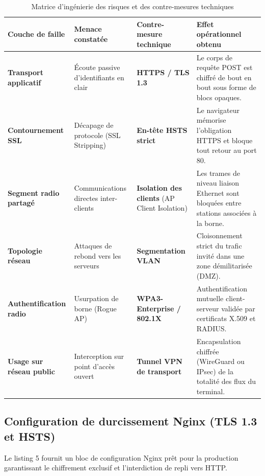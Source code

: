 \documentclass[a4paper,11pt]{article}
\begin{document}
\begin{table}[htbp]
\centering
\small
\caption{Matrice d'ingénierie des risques et des contre-mesures techniques}
\begin{tabularx}{\textwidth}{l p{3.2cm} p{3.6cm} X}
\toprule
\textbf{Couche de faille} & \textbf{Menace constatée} & \textbf{Contre-mesure technique} & \textbf{Effet opérationnel obtenu} \\
\midrule
\textbf{Transport applicatif} & Écoute passive d'identifiants en clair & \textbf{HTTPS / TLS 1.3} & Le corps de requête POST est chiffré de bout en bout sous forme de blocs opaques. \\
\textbf{Contournement SSL} & Décapage de protocole (SSL Stripping) & \textbf{En-tête HSTS strict} & Le navigateur mémorise l'obligation HTTPS et bloque tout retour au port 80. \\
\textbf{Segment radio partagé} & Communications directes inter-clients & \textbf{Isolation des clients} (AP Client Isolation) & Les trames de niveau liaison Ethernet sont bloquées entre stations associées à la borne. \\
\textbf{Topologie réseau} & Attaques de rebond vers les serveurs & \textbf{Segmentation VLAN} & Cloisonnement strict du trafic invité dans une zone démilitarisée (DMZ). \\
\textbf{Authentification radio} & Usurpation de borne (Rogue AP) & \textbf{WPA3-Enterprise / 802.1X} & Authentification mutuelle client-serveur validée par certificats X.509 et RADIUS. \\
\textbf{Usage sur réseau public} & Interception sur point d'accès ouvert & \textbf{Tunnel VPN de transport} & Encapsulation chiffrée (WireGuard ou IPsec) de la totalité des flux du terminal. \\
\bottomrule
\end{tabularx}
\end{table}

\subsection{Configuration de durcissement Nginx (TLS 1.3 et HSTS)}
Le listing 5 fournit un bloc de configuration Nginx prêt pour la production garantissant le chiffrement exclusif et l'interdiction de repli vers HTTP.
\end{document}
